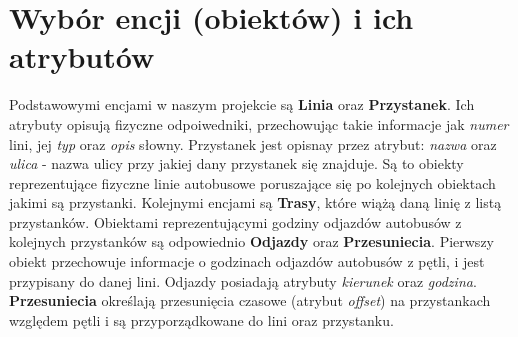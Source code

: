 \section{Wybór encji (obiektów) i ich atrybutów}

Podstawowymi encjami w naszym projekcie są \textbf{Linia} oraz \textbf{Przystanek}. 
Ich atrybuty opisują fizyczne odpoiwedniki, przechowując takie informacje jak \textit{numer}
lini, jej \textit{typ} oraz \textit{opis} słowny. Przystanek jest opisnay przez atrybut: 
\textit{nazwa} oraz \textit{ulica} - nazwa ulicy przy jakiej dany przystanek się znajduje.
Są to obiekty reprezentujące fizyczne linie autobusowe poruszające się po kolejnych 
obiektach jakimi są przystanki. Kolejnymi encjami są \textbf{Trasy}, które wiążą 
daną linię z listą przystanków. Obiektami reprezentującymi godziny odjazdów autobusów
z kolejnych przystanków są odpowiednio \textbf{Odjazdy} oraz \textbf{Przesuniecia}.
Pierwszy obiekt przechowuje informacje o godzinach odjazdów autobusów z pętli, i jest 
przypisany do danej lini. Odjazdy posiadają atrybuty \textit{kierunek} oraz \textit{godzina}.
\textbf{Przesuniecia} określają przesunięcia czasowe (atrybut \textit{offset}) na przystankach 
względem pętli i są przyporządkowane do lini oraz przystanku.
